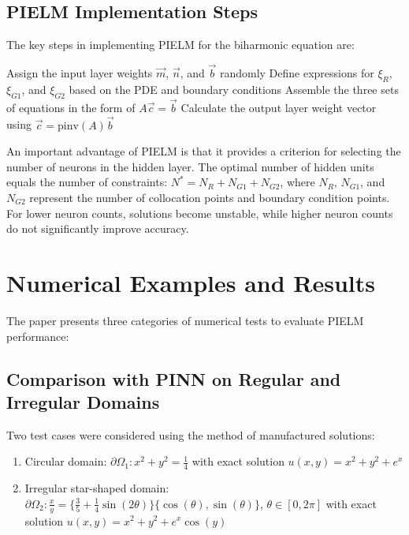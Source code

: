 \documentclass[11pt]{article}
\begin{document}
\subsection{PIELM Implementation Steps}

The key steps in implementing PIELM for the biharmonic equation are:

\begin{algorithm}
\caption{PIELM for Biharmonic Equation}
\begin{algorithmic}[1]
\State Assign the input layer weights $\vec{m}$, $\vec{n}$, and $\vec{b}$ randomly
\State Define expressions for $\xi_R$, $\xi_{G1}$, and $\xi_{G2}$ based on the PDE and boundary conditions
\State Assemble the three sets of equations in the form of $A\vec{c} = \vec{b}$
\State Calculate the output layer weight vector using $\vec{c} = \text{pinv}(A)\vec{b}$
\end{algorithmic}
\end{algorithm}

An important advantage of PIELM is that it provides a criterion for selecting the number of neurons in the hidden layer. The optimal number of hidden units equals the number of constraints: $N^* = N_R + N_{G1} + N_{G2}$, where $N_R$, $N_{G1}$, and $N_{G2}$ represent the number of collocation points and boundary condition points. For lower neuron counts, solutions become unstable, while higher neuron counts do not significantly improve accuracy.

\section{Numerical Examples and Results}

The paper presents three categories of numerical tests to evaluate PIELM performance:

\subsection{Comparison with PINN on Regular and Irregular Domains}

Two test cases were considered using the method of manufactured solutions:

\begin{enumerate}
    \item Circular domain: $\partial\Omega_1: x^2 + y^2 = \frac{1}{4}$ with exact solution $u(x,y) = x^2 + y^2 + e^x$
    \item Irregular star-shaped domain: $\partial\Omega_2: \frac{x}{y} = \{\frac{3}{5} + \frac{1}{4}\sin(2\theta)\}\{\cos(\theta), \sin(\theta)\}$, $\theta \in [0,2\pi]$ with exact solution $u(x,y) = x^2 + y^2 + e^x \cos(y)$
\end{enumerate}
\end{document}
